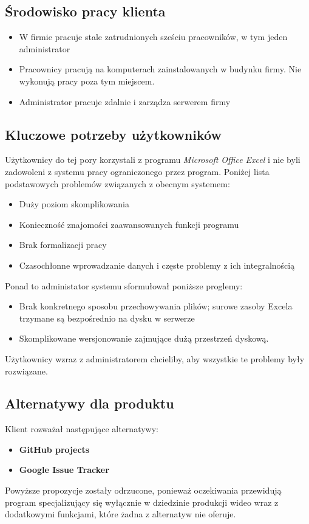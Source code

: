 \documentclass{article}
\begin{document}
\subsection{Środowisko pracy klienta}
\begin{itemize}
    \item W firmie pracuje stale zatrudnionych sześciu pracowników, w tym jeden administrator
    \item Pracownicy pracują na komputerach zainstalowanych w budynku firmy. Nie wykonują pracy poza tym miejscem.
    \item Administrator pracuje zdalnie i zarządza serwerem firmy
\end{itemize}
\subsection{Kluczowe potrzeby użytkowników}
Użytkownicy do tej pory korzystali z programu \textit{Microsoft Office Excel} i nie
byli zadowoleni z systemu pracy ograniczonego przez program.
Poniżej lista podstawowych problemów związanych z obecnym systemem:
\begin{itemize}
    \item Duży poziom skomplikowania
    \item Konieczność znajomości zaawansowanych funkcji programu
    \item Brak formalizacji pracy
    \item Czasochłonne wprowadzanie danych i częste problemy z ich integralnością
\end{itemize}
Ponad to administator systemu sformułował poniższe proglemy:
\begin{itemize}
    \item Brak konkretnego sposobu przechowywania plików; surowe zasoby Excela trzymane są bezpośrednio na dysku w serwerze
    \item Skomplikowane wersjonowanie zajmujące dużą przestrzeń dyskową.
\end{itemize} 
Użytkownicy wzraz z administratorem chcieliby, aby wszystkie te problemy były rozwiązane.
\subsection{Alternatywy dla produktu}
Klient rozważał następujące alternatywy:
\begin{itemize}
    \item \textbf{GitHub projects}
    \item \textbf{Google Issue Tracker}
\end{itemize}
Powyższe propozycje zostały odrzucone, ponieważ oczekiwania przewidują
program specjalizujący się wyłącznie w dziedzinie produkcji wideo wraz z 
dodatkowymi funkcjami, które żadna z alternatyw nie oferuje.
\newpage
\end{document}
